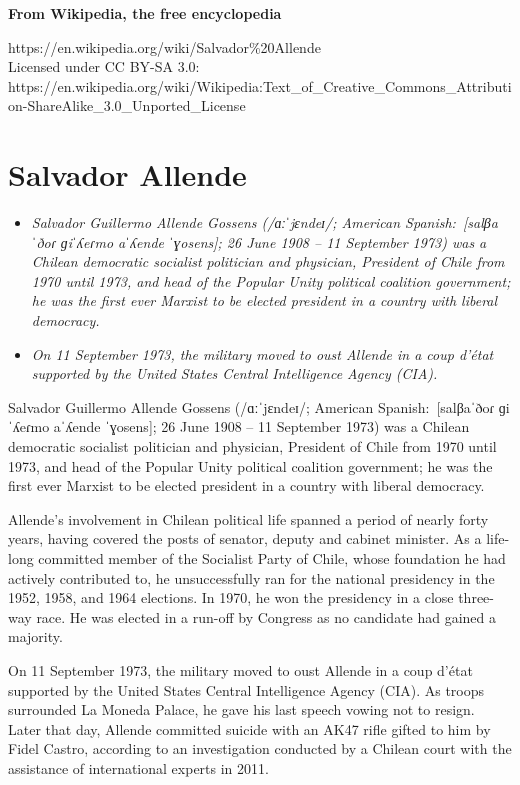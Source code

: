 \textbf{From Wikipedia, the free encyclopedia}

https://en.wikipedia.org/wiki/Salvador\%20Allende\\
Licensed under CC BY-SA 3.0:\\
https://en.wikipedia.org/wiki/Wikipedia:Text\_of\_Creative\_Commons\_Attribution-ShareAlike\_3.0\_Unported\_License

\section{Salvador Allende}\label{salvador-allende}

\begin{itemize}
\item
  \emph{Salvador Guillermo Allende Gossens (/ɑːˈjɛndeɪ/; American
  Spanish:~{[}salβaˈðoɾ ɡiˈʎeɾmo aˈʎende ˈɣosens{]}; 26 June 1908 -- 11
  September 1973) was a Chilean democratic socialist politician and
  physician, President of Chile from 1970 until 1973, and head of the
  Popular Unity political coalition government; he was the first ever
  Marxist to be elected president in a country with liberal democracy.}
\item
  \emph{On 11 September 1973, the military moved to oust Allende in a
  coup d'état supported by the United States Central Intelligence Agency
  (CIA).}
\end{itemize}

Salvador Guillermo Allende Gossens (/ɑːˈjɛndeɪ/; American
Spanish:~{[}salβaˈðoɾ ɡiˈʎeɾmo aˈʎende ˈɣosens{]}; 26 June 1908 -- 11
September 1973) was a Chilean democratic socialist politician and
physician, President of Chile from 1970 until 1973, and head of the
Popular Unity political coalition government; he was the first ever
Marxist to be elected president in a country with liberal democracy.

Allende's involvement in Chilean political life spanned a period of
nearly forty years, having covered the posts of senator, deputy and
cabinet minister. As a life-long committed member of the Socialist Party
of Chile, whose foundation he had actively contributed to, he
unsuccessfully ran for the national presidency in the 1952, 1958, and
1964 elections. In 1970, he won the presidency in a close three-way
race. He was elected in a run-off by Congress as no candidate had gained
a majority.

On 11 September 1973, the military moved to oust Allende in a coup
d'état supported by the United States Central Intelligence Agency (CIA).
As troops surrounded La Moneda Palace, he gave his last speech vowing
not to resign. Later that day, Allende committed suicide with an AK47
rifle gifted to him by Fidel Castro, according to an investigation
conducted by a Chilean court with the assistance of international
experts in 2011.


